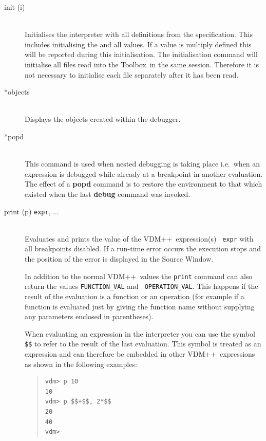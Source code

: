 \documentclass[\pformat,12pt]{article}
\newcommand{\vdmslpp}{VDM++}
\newcommand{\Toolbox}{Toolbox}
\newcommand{\guicmd}[1]{{\sf #1}}
\begin{document}
\begin{description}
\item[init (i)] \mbox{}\\ Initialises
  the interpreter with all definitions from the specification. This
  includes initialising the
   and all
  values. If a value is multiply defined this will be reported during
  this initialisation. The initialisation command will initialise all
  files read into the \Toolbox\ in the same session. Therefore it is
  not necessary to initialise each file separately after it has been
  read.
  

\item[*objects] \mbox{}\\
  Displays the objects created within the debugger.

\item[*popd] \mbox{}\\
  This command is used when nested debugging is taking place i.e.\ when
  an expression is debugged while already at a breakpoint in another
  evaluation. The effect of a 
  \textbf{popd} command is to restore the environment to that which
  existed when the last \textbf{debug} command was invoked.

\item[print (p) {\tt expr}, ...] \mbox{}\\
  Evaluates and prints the value of the \vdmslpp\ expression(s) {\tt
    expr} with all breakpoints disabled. If a run-time error occurs
  the execution stops and the position of the error is
  displayed in the \guicmd{Source Window}.
  
  In addition to the normal \vdmslpp\ values the {\tt print} command
  can also return the values {\tt FUNCTION\_VAL} and {\tt
    OPERATION\_VAL}\@.  This happens if the result of the evaluation is
  a function or an operation (for example if a function
  is evaluated just by giving the function name without supplying any
  parameters enclosed in parentheses).
  
  When evaluating an expression in the interpreter you can use the 
  symbol {\tt \$\$}\index{\$\$} to refer to the result of the last
  evaluation. This symbol is treated as an expression and can
  therefore be embedded in other \vdmslpp\ expressions as shown in
  the following examples:

\begin{quote}
\begin{verbatim}
vdm> p 10
10
vdm> p $$+$$, 2*$$
20
40
vdm> 
\end{verbatim}
\end{quote}


\end{description}
\end{document}
